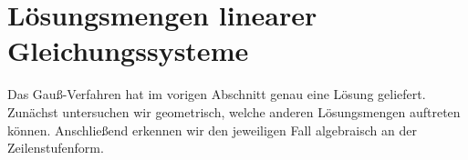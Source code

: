\section{Lösungsmengen linearer Gleichungssysteme}
\label{sec:linear_systems_solution_sets}

Das Gauß-Verfahren hat im vorigen Abschnitt genau eine Lösung geliefert.
Zunächst untersuchen wir geometrisch, welche anderen Lösungsmengen auftreten
können. Anschließend erkennen wir den jeweiligen Fall algebraisch an der
Zeilenstufenform.





